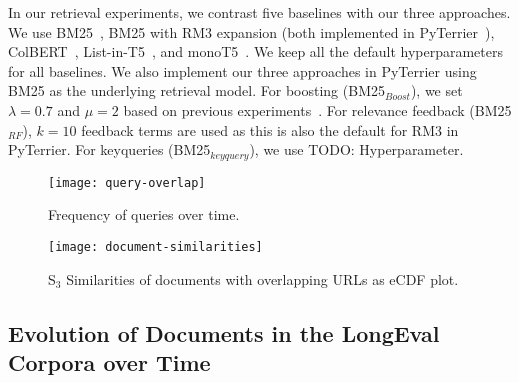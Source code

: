 In our retrieval experiments, we contrast five baselines with our three approaches. We use BM25~\cite{robertson:1994}, BM25 with RM3 expansion (both implemented in PyTerrier~\cite{macdonald:2020}), ColBERT~\cite{khattab:2020}, List-in-T5~\cite{tamber:2023}, and monoT5~\cite{nogueira:2020}. We keep all the default hyperparameters for all baselines. We also implement our three approaches in PyTerrier using BM25 as the underlying retrieval model. For boosting (BM25$_{Boost}$), we set $\lambda=0.7$ and $\mu=2$ based on previous experiments~\cite{keller:2024b}. For relevance feedback (BM25$_{RF}$), $k=10$ feedback terms are used as this is also the default for RM3 in PyTerrier. For keyqueries (BM25$_{keyquery}$), we use {\color{red} TODO: Hyperparameter}.



\begin{figure}[t]
    \begin{minipage}{.49\textwidth}
        \texttt{[image: query-overlap]}
        \vspace{-4ex}
        \caption{Frequency of queries over time.}
        \label{fig:query-overlap}
    \end{minipage}
    \hfill    
    \begin{minipage}{.49\textwidth}
        \texttt{[image: document-similarities]}
        \vspace{-4ex}
        \caption{S$_{3}$ Similarities of documents with overlapping URLs as eCDF plot.}
        \label{fig:document-similarities}
    \end{minipage}
\end{figure}

\subsection{Evolution of Documents in the LongEval Corpora over Time}

